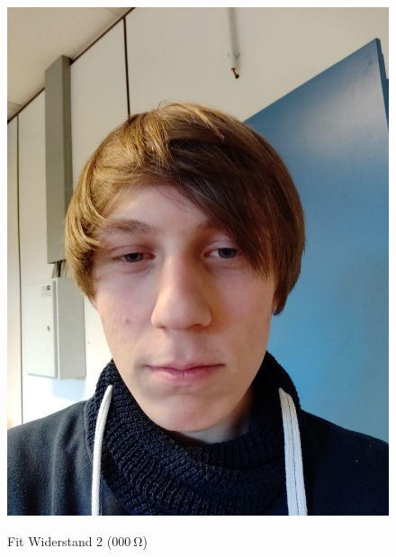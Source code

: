 \documentclass[12pt,twoside,a4paper]{scrartcl}
\begin{document}
\begin{figure}[H]
\begin{minipage}{0.4 \textwidth}
{						\includegraphics[width = \textwidth]{Pictures/Platzhalter}
					}
				\caption{Fit Widerstand 2 ($\SI{000}{\ohm}$)}
				\end{minipage}
			\end{figure}
\end{document}
